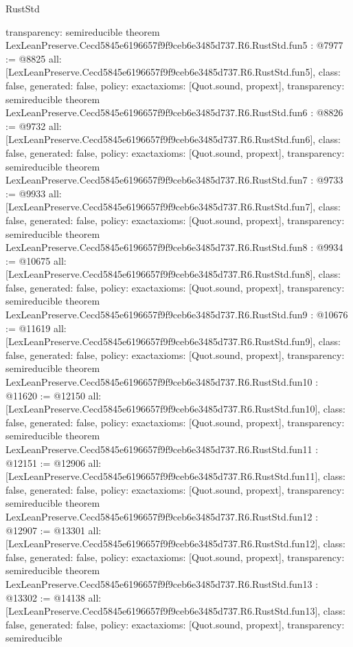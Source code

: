 \begin{lexlean}{RustStd}
\begin{coremodule}
{  transparency: semireducible
}
theorem LexLeanPreserve.Cecd5845e6196657f9f9ceb6e3485d737.R6.RustStd.fun5 : @7977 := @8825 {
  all: [LexLeanPreserve.Cecd5845e6196657f9f9ceb6e3485d737.R6.RustStd.fun5],
  class: false,
  generated: false,
  policy: exact{axioms: [Quot.sound, propext]},
  transparency: semireducible
}
theorem LexLeanPreserve.Cecd5845e6196657f9f9ceb6e3485d737.R6.RustStd.fun6 : @8826 := @9732 {
  all: [LexLeanPreserve.Cecd5845e6196657f9f9ceb6e3485d737.R6.RustStd.fun6],
  class: false,
  generated: false,
  policy: exact{axioms: [Quot.sound, propext]},
  transparency: semireducible
}
theorem LexLeanPreserve.Cecd5845e6196657f9f9ceb6e3485d737.R6.RustStd.fun7 : @9733 := @9933 {
  all: [LexLeanPreserve.Cecd5845e6196657f9f9ceb6e3485d737.R6.RustStd.fun7],
  class: false,
  generated: false,
  policy: exact{axioms: [Quot.sound, propext]},
  transparency: semireducible
}
theorem LexLeanPreserve.Cecd5845e6196657f9f9ceb6e3485d737.R6.RustStd.fun8 : @9934 := @10675 {
  all: [LexLeanPreserve.Cecd5845e6196657f9f9ceb6e3485d737.R6.RustStd.fun8],
  class: false,
  generated: false,
  policy: exact{axioms: [Quot.sound, propext]},
  transparency: semireducible
}
theorem LexLeanPreserve.Cecd5845e6196657f9f9ceb6e3485d737.R6.RustStd.fun9 : @10676 := @11619 {
  all: [LexLeanPreserve.Cecd5845e6196657f9f9ceb6e3485d737.R6.RustStd.fun9],
  class: false,
  generated: false,
  policy: exact{axioms: [Quot.sound, propext]},
  transparency: semireducible
}
theorem LexLeanPreserve.Cecd5845e6196657f9f9ceb6e3485d737.R6.RustStd.fun10 : @11620 := @12150 {
  all: [LexLeanPreserve.Cecd5845e6196657f9f9ceb6e3485d737.R6.RustStd.fun10],
  class: false,
  generated: false,
  policy: exact{axioms: [Quot.sound, propext]},
  transparency: semireducible
}
theorem LexLeanPreserve.Cecd5845e6196657f9f9ceb6e3485d737.R6.RustStd.fun11 : @12151 := @12906 {
  all: [LexLeanPreserve.Cecd5845e6196657f9f9ceb6e3485d737.R6.RustStd.fun11],
  class: false,
  generated: false,
  policy: exact{axioms: [Quot.sound, propext]},
  transparency: semireducible
}
theorem LexLeanPreserve.Cecd5845e6196657f9f9ceb6e3485d737.R6.RustStd.fun12 : @12907 := @13301 {
  all: [LexLeanPreserve.Cecd5845e6196657f9f9ceb6e3485d737.R6.RustStd.fun12],
  class: false,
  generated: false,
  policy: exact{axioms: [Quot.sound, propext]},
  transparency: semireducible
}
theorem LexLeanPreserve.Cecd5845e6196657f9f9ceb6e3485d737.R6.RustStd.fun13 : @13302 := @14138 {
  all: [LexLeanPreserve.Cecd5845e6196657f9f9ceb6e3485d737.R6.RustStd.fun13],
  class: false,
  generated: false,
  policy: exact{axioms: [Quot.sound, propext]},
  transparency: semireducible
}
\end{coremodule}
\end{lexlean}
